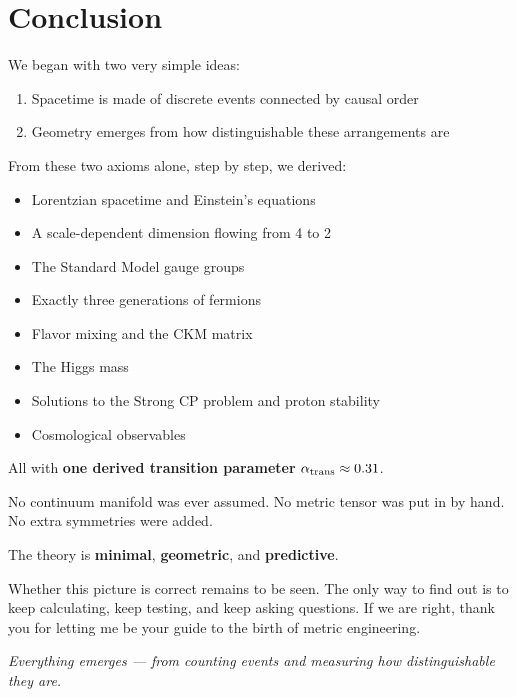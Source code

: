 \documentclass[11pt, a4paper, openany]{book}
\begin{document}

\chapter{Conclusion}

We began with two very simple ideas:

\begin{enumerate}
  \item Spacetime is made of discrete events connected by causal order
  \item Geometry emerges from how distinguishable these arrangements are
\end{enumerate}

From these two axioms alone, step by step, we derived:

\begin{itemize}
  \item Lorentzian spacetime and Einstein's equations
  \item A scale-dependent dimension flowing from 4 to 2
  \item The Standard Model gauge groups
  \item Exactly three generations of fermions
  \item Flavor mixing and the CKM matrix
  \item The Higgs mass
  \item Solutions to the Strong CP problem and proton stability
  \item Cosmological observables
\end{itemize}

All with \textbf{one derived transition parameter} $\alpha_{\rm trans} \approx 0.31$.

No continuum manifold was ever assumed.
No metric tensor was put in by hand.
No extra symmetries were added.

The theory is \textbf{minimal}, \textbf{geometric}, and \textbf{predictive}.

Whether this picture is correct remains to be seen.
The only way to find out is to keep calculating, keep testing, and keep asking questions. If we are right, thank you for letting me be your guide to the birth of metric engineering.

\begin{center}
\textit{Everything emerges --- from counting events and measuring how distinguishable they are.}
\end{center}
\end{document}
